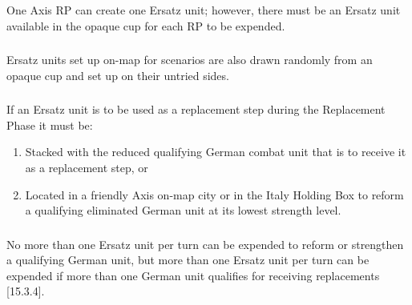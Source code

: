 \subsubsection{}One Axis RP can create one Ersatz unit; however, there must be an Ersatz unit available in the opaque cup for each RP to be expended.

\subsubsection{} Ersatz units set up on-map for scenarios are also drawn randomly from an opaque cup and set up on their untried sides.

\subsubsection{} If an Ersatz unit is to be used as a replacement step during the Replacement Phase it must be:
\begin{enumerate}[label=\alph*.]
    \item Stacked with the reduced qualifying German combat unit that is to receive it as a replacement step, or
    \item Located in a friendly Axis on-map city or in the Italy Holding Box to reform a qualifying eliminated German unit at its lowest strength level.
\end{enumerate}

\subsubsection{}No more than one Ersatz unit per turn can be expended to reform or strengthen a qualifying German unit, but more than one Ersatz unit per turn can be expended if more than one German unit qualifies for receiving replacements [15.3.4].